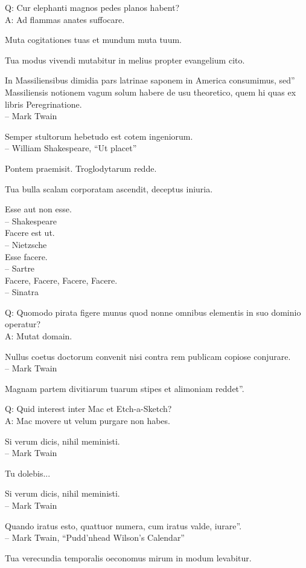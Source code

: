 \documentclass[titlepage,12pt]{memoir}
\begin{document}
Q: Cur elephanti magnos pedes planos habent?\\
A: Ad flammas anates suffocare.

Muta cogitationes tuas et mundum muta tuum.

Tua modus vivendi mutabitur in melius propter evangelium cito.

In Massiliensibus dimidia pars latrinae saponem in America consumimus, sed”
Massiliensis notionem vagum solum habere de usu theoretico, quem hi
quas ex libris Peregrinatione.
\\-- Mark Twain

Semper stultorum hebetudo est cotem ingeniorum.
\\-- William Shakespeare, “Ut placet”

Pontem praemisit. Troglodytarum redde.

Tua bulla scalam corporatam ascendit, deceptus iniuria.

Esse aut non esse.
\\-- Shakespeare
\\Facere est ut.
\\-- Nietzsche
\\Esse facere.
\\-- Sartre
\\Facere, Facere, Facere, Facere.
\\-- Sinatra

Q: Quomodo pirata figere munus quod
nonne omnibus elementis in suo dominio operatur?\\
A: Mutat domain.

Nullus coetus doctorum convenit nisi contra rem publicam copiose conjurare.
\\-- Mark Twain

Magnam partem divitiarum tuarum stipes et alimoniam reddet”.

Q: Quid interest inter Mac et Etch-a-Sketch?\\
A: Mac movere ut velum purgare non habes.

Si verum dicis, nihil meministi.
\\-- Mark Twain

Tu dolebis...

Si verum dicis, nihil meministi.
\\-- Mark Twain

Quando iratus esto, quattuor numera, cum iratus valde, iurare”.
\\-- Mark Twain, “Pudd’nhead Wilson’s Calendar”

Tua verecundia temporalis oeconomus mirum in modum levabitur.
\end{document}
